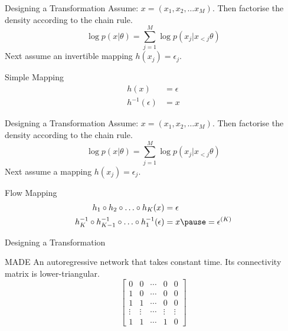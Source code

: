 \documentclass[14pt]{beamer}
\begin{document}
\begin{frame}{Designing a Transformation}
Assume: $ x = (x_{1}, x_{2}, \ldots x_{M}) $.
Then factorise the density according to the chain rule.
\begin{equation*}
\log p(x|\theta) = \sum_{j=1}^{M} \log p(x_{j}|x_{<j}\theta)
\end{equation*}
Next assume an invertible mapping $ h(x_{j}) = \epsilon_{j} $.
\begin{block}{Simple Mapping}
\begin{equation*}
\begin{aligned}
h(x) &= \epsilon \\
h^{-1}(\epsilon) &= x
\end{aligned}
\end{equation*}
\end{block}
\end{frame}

\begin{frame}{Designing a Transformation}
Assume: $ x = (x_{1}, x_{2}, \ldots x_{M}) $.
Then factorise the density according to the chain rule.
\begin{equation*}
\log p(x|\theta) = \sum_{j=1}^{M} \log p(x_{j}|x_{<j}\theta)
\end{equation*}
Next assume a mapping $ h(x_{j}) = \epsilon_{j} $.
\begin{block}{Flow Mapping}
\begin{equation*}
\begin{aligned}
h_{1}\circ h_{2} \circ\ldots\circ h_{K}(x) &= \epsilon \\
h^{-1}_{K}\circ h^{-1}_{K-1}\circ\ldots \circ h^{-1}_{1}(\epsilon) &= x \pause = \epsilon^{(K)}
\end{aligned}
\end{equation*}
\end{block}
\end{frame}

\begin{frame}{Designing a Transformation}
\begin{block}{MADE \citep{GermainEtAl:2015}}
An autoregressive network that takes constant time. Its connectivity matrix is lower-triangular.
\begin{equation*}
\begin{bmatrix}
0 & 0 & \cdots & 0 & 0 \\
1 & 0 & \cdots & 0 & 0 \\
1 & 1 & \cdots & 0 & 0 \\
\vdots & \vdots & \cdots & \vdots & \vdots \\
1 & 1 & \cdots & 1 & 0
\end{bmatrix}
\end{equation*}
\end{block}
\end{frame}
\end{document}
